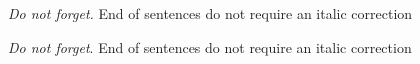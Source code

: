 \documentclass{amsart}
\begin{document}
{\itshape Do not forget.} End of sentences do not require an italic correction

{\itshape Do not forget}. End of sentences do not require an italic correction
\end{document}
